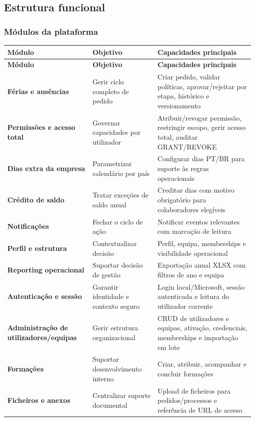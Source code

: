 \documentclass[11pt,a4paper,twoside]{article}
\newcommand{\tH}[1]{\textbf{\sffamily\small\color{white}#1}}
\newcommand{\theadrow}{\rowcolor{ACCENT}}
\begin{document}
\subsection{Estrutura funcional}

\subsubsection{Módulos da plataforma}

\begin{longtable}{>{\small\bfseries}p{3.2cm} >{\small}p{5.0cm} >{\small}p{6.0cm}}
\theadrow
\tH{Módulo} & \tH{Objetivo} & \tH{Capacidades principais} \\
\midrule
\endfirsthead
\theadrow
\tH{Módulo} & \tH{Objetivo} & \tH{Capacidades principais} \\
\midrule
\endhead
Férias e ausências & Gerir ciclo completo de pedido & Criar pedido, validar políticas, aprovar/rejeitar por etapa, histórico e versionamento \\
Permissões e acesso total & Governar capacidades por utilizador & Atribuir/revogar permissão, restringir escopo, gerir acesso total, auditar GRANT/REVOKE \\
Dias extra da empresa & Parametrizar calendário por país & Configurar dias PT/BR para suporte às regras operacionais \\
Crédito de saldo & Tratar exceções de saldo anual & Creditar dias com motivo obrigatório para colaboradores elegíveis \\
Notificações & Fechar o ciclo de ação & Notificar eventos relevantes com marcação de leitura \\
Perfil e estrutura & Contextualizar decisão & Perfil, equipa, memberships e visibilidade operacional \\
Reporting operacional & Suportar decisão de gestão & Exportação anual XLSX com filtros de ano e equipa \\
Autenticação e sessão & Garantir identidade e contexto seguro & Login local/Microsoft, sessão autenticada e leitura do utilizador corrente \\
Administração de utilizadores/equipas & Gerir estrutura organizacional & CRUD de utilizadores e equipas, ativação, credenciais, memberships e importação em lote \\
Formações & Suportar desenvolvimento interno & Criar, atribuir, acompanhar e concluir formações \\
Ficheiros e anexos & Centralizar suporte documental & Upload de ficheiros para pedidos/processos e referência de URL de acesso \\
\bottomrule
\end{longtable}
\end{document}
